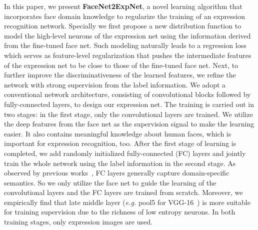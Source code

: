 \documentclass[a4paper, 10pt, conference]{ieeeconf}      %
\begin{document}
   
In this paper, we present \textbf{FaceNet2ExpNet}, a novel learning algorithm that incorporates face domain knowledge to regularize the training of an expression recognition network. 
Specially we first propose a new distribution function to model the high-level neurons of the expression net using the information derived from the fine-tuned face net. 
Such modeling naturally leads to a regression loss which serves as feature-level regularization that pushes the intermediate features of the expression net to be close to those of the fine-tuned face net. Next, to further improve the discriminativeness of the learned features, we refine the network with strong supervision from the label information. 
We adopt a conventional network architecture, consisting of convolutional blocks followed by fully-connected layers, to design our expression net.
The training is carried out in two stages: 
in the first stage, only the convolutional layers are trained. We utilize the deep features from the face net as the supervision signal to make the learning easier. It also contains meaningful knowledge about human faces, which is important for expression recognition, too. 
After the first stage of learning is completed,  we add randomly initialized fully-connected (FC) layers and jointly train the whole network using the label information in the second stage. As observed by previous works~\cite{vittayakorn2016automatic}, FC layers generally capture domain-specific semantics. So we only utilize the face net to guide the learning of the convolutional layers and the FC layers are trained from scratch. Moreover, we empirically find that late middle layer (\emph{e.g.} pool5 for VGG-16~\cite{Simonyan14c}) is more suitable for training supervision due to the richness of low entropy neurons.
In both training stages, only expression images are used.
\end{document}
